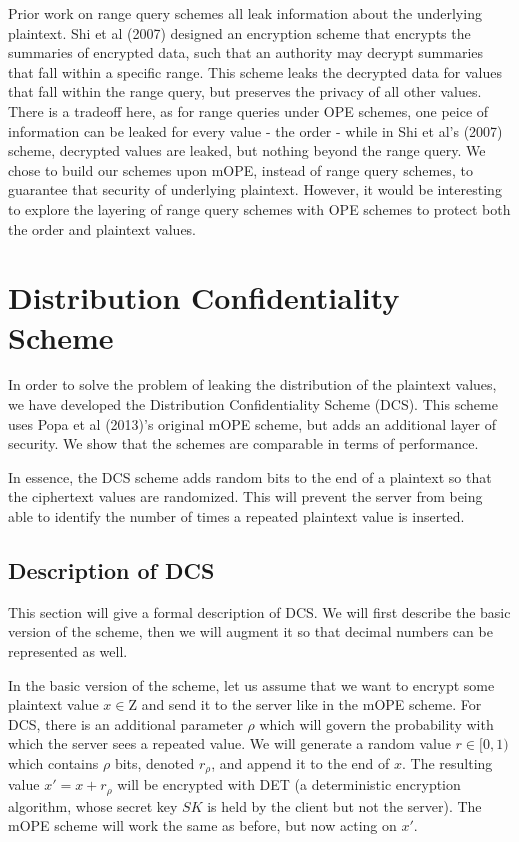 \documentclass[12pt]{article}
\begin{document}
Prior work on range query schemes all leak information about the underlying plaintext. Shi et al (2007) designed an encryption scheme that encrypts the summaries of encrypted data, such that an authority may decrypt summaries that fall within a specific range. This scheme leaks the decrypted data for values that fall within the range query, but preserves the privacy of all other values. There is a tradeoff here, as for range queries under OPE schemes, one peice of information can be leaked for every value - the order - while in Shi et al's (2007) scheme, decrypted values are leaked, but nothing beyond the range query. We chose to build our schemes upon mOPE, instead of range query schemes, to guarantee that security of underlying plaintext. However, it would be interesting to explore the layering of range query schemes with OPE schemes to protect both the order and plaintext values.

\section{Distribution Confidentiality Scheme}

In order to solve the problem of leaking the distribution of the plaintext values, we have developed the Distribution Confidentiality Scheme (DCS). This scheme uses Popa et al (2013)'s original mOPE scheme, but adds an additional layer of security. We show that the schemes are comparable in terms of performance.

In essence, the DCS scheme adds random bits to the end of a plaintext so that the ciphertext values are randomized. This will prevent the server from being able to identify the number of times a repeated plaintext value is inserted.

\subsection{Description of DCS}

This section will give a formal description of DCS. We will first describe the basic version of the scheme, then we will augment it so that decimal numbers can be represented as well.

In the basic version of the scheme, let us assume that we want to encrypt some plaintext value $x \in \mathrm{Z}$ and send it to the server like in the mOPE scheme. For DCS, there is an additional parameter $\rho$ which will govern the probability with which the server sees a repeated value. We will generate a random value $r \in [0,1)$ which contains $\rho$ bits, denoted $r_{\rho}$, and append it to the end of $x$. The resulting value $x' = x + r_{\rho}$ will be encrypted with DET (a deterministic encryption algorithm, whose secret key $SK$ is held by the client but not the server). The mOPE scheme will work the same as before, but now acting on $x'$.
\end{document}
